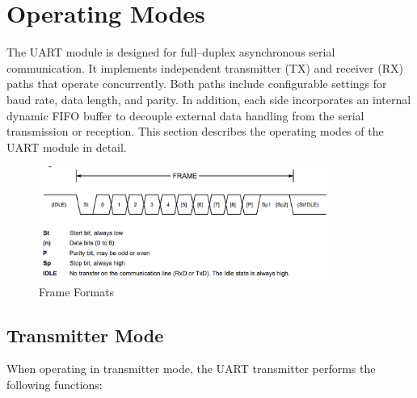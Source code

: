 \section{Operating Modes}

The UART module is designed for full–duplex asynchronous serial communication. It implements independent transmitter (TX) and receiver (RX) paths that operate concurrently. Both paths include configurable settings for baud rate, data length, and parity. In addition, each side incorporates an internal dynamic FIFO buffer to decouple external data handling from the serial transmission or reception. This section describes the operating modes of the UART module in detail.

\begin{figure}[H]
    \centering
    \includegraphics[width=0.85\textwidth]{images/frame_format.png}
    \caption{Frame Formats}
    \label{fig:frame_formats}
  \end{figure}
  
\subsection{Transmitter Mode}

When operating in transmitter mode, the UART transmitter performs the following functions:


